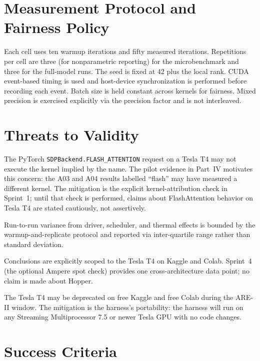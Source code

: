 \documentclass[11pt]{article}
\begin{document}
\section{Measurement Protocol and Fairness Policy}

Each cell uses ten warmup iterations and fifty measured iterations. Repetitions per cell are three (for nonparametric reporting) for the microbenchmark and three for the full-model runs. The seed is fixed at 42 plus the local rank. CUDA event-based timing is used and host-device synchronization is performed before recording each event. Batch size is held constant across kernels for fairness. Mixed precision is exercised explicitly via the precision factor and is not interleaved.

\section{Threats to Validity}

\begin{description}[leftmargin=2em]
    \item[Construct validity (the most important threat in this work).] The PyTorch \texttt{SDPBackend.FLASH\_ATTENTION} request on a Tesla T4 may not execute the kernel implied by the name. The pilot evidence in Part~IV motivates this concern: the A03 and A04 results labelled \enquote{flash} may have measured a different kernel. The mitigation is the explicit kernel-attribution check in Sprint~1; until that check is performed, claims about FlashAttention behavior on Tesla T4 are stated cautiously, not assertively.
    \item[Internal validity.] Run-to-run variance from driver, scheduler, and thermal effects is bounded by the warmup-and-replicate protocol and reported via inter-quartile range rather than standard deviation.
    \item[External validity.] Conclusions are explicitly scoped to the Tesla T4 on Kaggle and Colab. Sprint~4 (the optional Ampere spot check) provides one cross-architecture data point; no claim is made about Hopper.
    \item[Reproducibility threat.] The Tesla T4 may be deprecated on free Kaggle and free Colab during the ARE-II window. The mitigation is the harness's portability: the harness will run on any Streaming Multiprocessor 7.5 or newer Tesla GPU with no code changes.
\end{description}

\section{Success Criteria}
\end{document}
